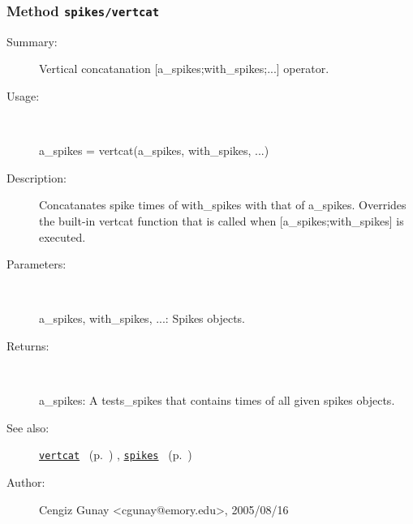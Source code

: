 \subsubsection[Method \texttt{vertcat}]{Method \texttt{spikes/vertcat}}%
%
\label{ref_spikes__vertcat}%
\hypertarget{ref_spikes__vertcat}{}%
\begin{description}
\item[Summary:]Vertical concatanation [a\_spikes;with\_spikes;...] operator.
%
\item[Usage:]~%
\begin{lyxcode}%
a\_spikes = vertcat(a\_spikes, with\_spikes, ...)
%
\end{lyxcode}%
%
\item[Description:]%
Concatanates spike times of with\_spikes with that of a\_spikes. Overrides the built-in
 vertcat function that is called when [a\_spikes;with\_spikes] is executed.
\item[Parameters:]~

a\_spikes, with\_spikes, ...: Spikes objects.
%
\item[Returns:
]~

	a\_spikes: A tests\_spikes that contains times of all given spikes objects.
%
%
\item[See also:]%
\hyperlink{ref_vertcat}{\texttt{vertcat}}%
\ (p.~\pageref{ref_vertcat})%
%
, \hyperlink{ref_spikes}{\texttt{spikes}}%
\ (p.~\pageref{ref_spikes})%
%
%
\item[Author:]%
Cengiz Gunay <cgunay@emory.edu>, 2005/08/16
%
\end{description}
\methodline%

